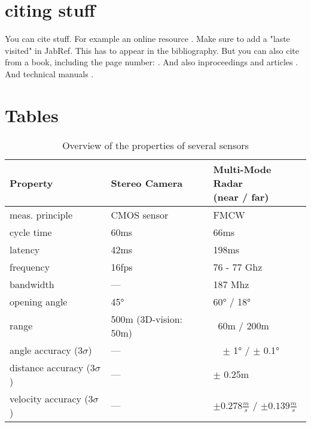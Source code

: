 \section{citing stuff}

You can cite stuff. For example an online resource \cite{adac_night}. Make sure to add a "laste visited" in JabRef. This has to appear in the bibliography. But you can also cite from a book, including the page number: \cite[p. 175]{mitchell1997}. And also inproceedings \cite{julier97} and articles \cite{Jin2003}. And technical manuals \cite{adma}.


\section{Tables}


\begin{table}[hbt]
	\begin{tabular}{p{4.0cm}C{3.6cm}C{4.0cm}}
		\toprule
		\textbf{Property}		&	\textbf{Stereo Camera}		&	\textbf{Multi-Mode Radar \newline (near / far)}	\\
		\midrule
		meas. principle	&	CMOS sensor			&	FMCW			\\
		cycle time		&	60ms				&	66ms			\\
		latency			&	42ms				&	198ms			\\
		\midrule
		frequency		&	16fps				&	76 - 77 Ghz		\\
		bandwidth		&	---					&	187 Mhz			\\
		\midrule
		opening angle	&	45°					&	60° / 18°			\\
		range			&	500m \newline (3D-vision: 50m)	&	~60m	/ 200m		\\
		\midrule
		angle accuracy ($3\sigma$)		&	---	&	~~$\pm$ 1° / $\pm$ 0.1°		\\
		distance accuracy ($3\sigma$)	&	---	&	$\pm$ 0.25m		\\
		velocity accuracy ($3\sigma$)	&	---	&	$\pm 0.278 \tfrac{m}{s}$ / $\pm 0.139 \tfrac{m}{s}$	\\
		\bottomrule
	\end{tabular}
	\caption{Overview of the properties of several sensors}
	\label{tab:sensor_properties}
\end{table}


